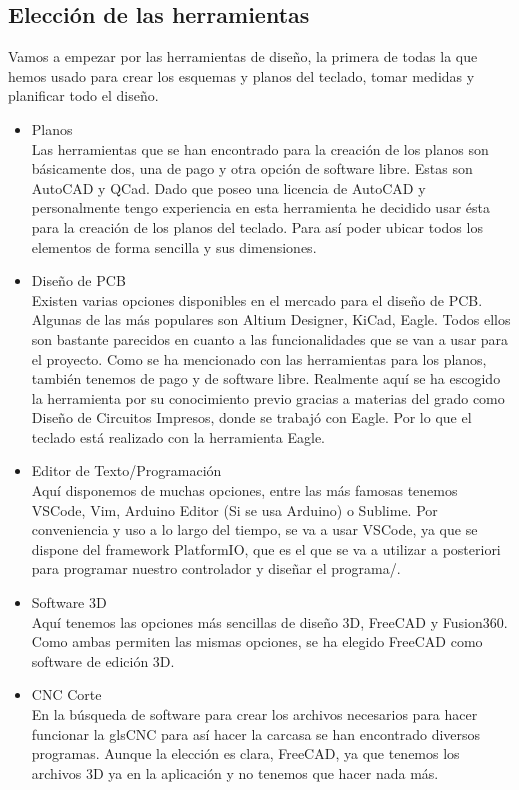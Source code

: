 \subsection{Elección de las herramientas} \label{Herramientas}
Vamos a empezar por las herramientas de diseño, la primera de todas la que hemos usado para crear los esquemas y planos del teclado, tomar medidas y planificar todo el diseño.

\begin{itemize}    
    \item Planos \\
    Las herramientas que se han encontrado para la creación de los planos son básicamente dos, una de pago y otra opción de software libre. Estas son AutoCAD y QCad. Dado que poseo una licencia de AutoCAD y personalmente tengo experiencia en esta herramienta he decidido usar ésta para la creación de los planos del teclado. Para así poder ubicar todos los elementos de forma sencilla y sus dimensiones.
    
    \item Diseño de \gls{PCB} \\
    Existen varias opciones disponibles en el mercado para el diseño de \gls{PCB}. Algunas de las más populares son Altium Designer, KiCad, Eagle. Todos ellos son bastante parecidos en cuanto a las funcionalidades que se van a usar para el proyecto. Como se ha mencionado con las herramientas para los planos, también tenemos de pago y de software libre. Realmente aquí se ha escogido la herramienta por su conocimiento previo gracias a materias del grado como Diseño de Circuitos Impresos, donde se trabajó con Eagle. Por lo que el teclado está realizado con la herramienta Eagle.
    
    \item Editor de Texto/Programación \\
    Aquí disponemos de muchas opciones, entre las más famosas tenemos VSCode, Vim, \gls{Arduino} Editor (Si se usa \gls{Arduino}) o Sublime. Por conveniencia y uso a lo largo del tiempo, se va a usar VSCode, ya que se dispone del framework \gls{PlatformIO}, que es el que se va a utilizar a posteriori para programar nuestro controlador y diseñar el programa/.
    
    \item Software 3D \\
    Aquí tenemos las opciones más sencillas de diseño 3D, FreeCAD y Fusion360. Como ambas permiten las mismas opciones, se ha elegido FreeCAD como software de edición 3D.
    
    \item \gls{CNC} Corte \\
    En la búsqueda de software para crear los archivos necesarios para hacer funcionar la gls{CNC} para así hacer la carcasa se han encontrado diversos programas. Aunque la elección es clara, FreeCAD, ya que tenemos los archivos 3D ya en la aplicación y no tenemos que hacer nada más.
    
\end{itemize}
\newpage

